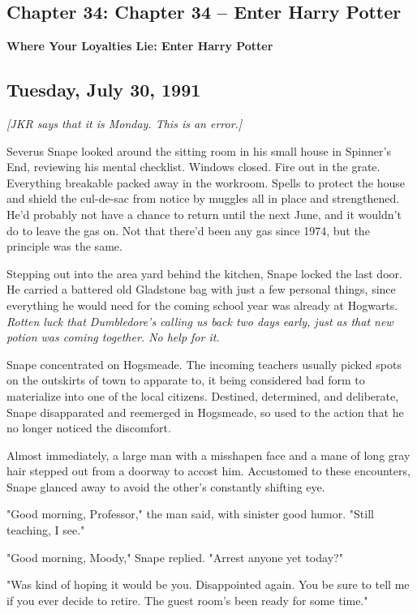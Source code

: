 \documentclass[a4paper,11pt]{article}
\begin{document}
\subsection{Chapter 34: Chapter 34 – Enter Harry Potter}

\textbf{Where Your Loyalties Lie: Enter Harry Potter}

\subsection{Tuesday, July 30, 1991}\emph{[JKR says that it is Monday. This is an error.]}

Severus Snape looked around the sitting room in his small house in Spinner's End, reviewing his mental checklist. Windows closed. Fire out in the grate. Everything breakable packed away in the workroom. Spells to protect the house and shield the cul-de-sac from notice by muggles all in place and strengthened. He'd probably not have a chance to return until the next June, and it wouldn't do to leave the gas on. Not that there'd been any gas since 1974, but the principle was the same.

Stepping out into the area yard behind the kitchen, Snape locked the last door. He carried a battered old Gladstone bag with just a few personal things, since everything he would need for the coming school year was already at Hogwarts. \emph{Rotten luck that Dumbledore's calling us back two days early, just as that new potion was coming together. No help for it.}

Snape concentrated on Hogsmeade. The incoming teachers usually picked spots on the outskirts of town to apparate to, it being considered bad form to materialize into one of the local citizens. Destined, determined, and deliberate, Snape disapparated and reemerged in Hogsmeade, so used to the action that he no longer noticed the discomfort.

Almost immediately, a large man with a misshapen face and a mane of long gray hair stepped out from a doorway to accost him. Accustomed to these encounters, Snape glanced away to avoid the other's constantly shifting eye.

"Good morning, Professor," the man said, with sinister good humor. "Still teaching, I see."

"Good morning, Moody," Snape replied. "Arrest anyone yet today?"

"Was kind of hoping it would be you. Disappointed again. You be sure to tell me if you ever decide to retire. The guest room's been ready for some time."
\end{document}
